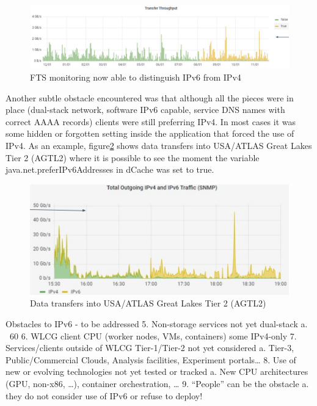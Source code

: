 \begin{figure}[h]
\centering
        \includegraphics[width=\linewidth]{fts-ipv6.png}
\caption{FTS monitoring now able to distinguish IPv6 from IPv4}
\label{fig:fts-ipv6}
\end{figure}

Another subtle obstacle encountered was that although all the pieces were in place (dual-stack network, software IPv6 capable, service DNS names with correct AAAA records) clients were still preferring IPv4. In most cases it was some hidden or forgotten setting inside the application that forced the use of IPv4.
As an example, figure\ref{fig:aglt2-ipv6} shows  data transfers into USA/ATLAS Great Lakes Tier 2 (AGTL2) where it is possible to see the moment the
variable java.net.preferIPv6Addresses in dCache was set to true.

\begin{figure}[h]
\centering
        \includegraphics[width=\linewidth]{aglt2-ipv6.png}
\caption{Data transfers into USA/ATLAS Great Lakes Tier 2 (AGTL2)}
\label{fig:aglt2-ipv6}
\end{figure}


Obstacles to IPv6 - to be addressed
5. Non-storage services not yet dual-stack
   a. ~60%
6. WLCG client CPU (worker nodes, VMs, containers) some IPv4-only
7. Services/clients outside of WLCG Tier-1/Tier-2 not yet considered
   a. Tier-3, Public/Commercial Clouds, Analysis facilities, Experiment portals…
8. Use of new or evolving technologies not yet tested or tracked
   a. New CPU architectures (GPU, non-x86, …), container orchestration, …
9. “People” can be the obstacle
   a. they do not consider use of IPv6 or refuse to deploy!


